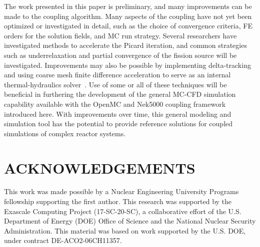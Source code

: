 \documentclass[letterpaper]{physor2018}
\begin{document}
The work presented in this paper is preliminary, and many improvements
can be made to the coupling algorithm. Many aspects of the coupling have not yet
been optimized or investigated in detail, such as the choice of convergence criteria,
FE orders for the solution fields, and MC run strategy. Several researchers
have investigated methods to accelerate the Picard iteration,
and common strategies such as underrelaxation and partial convergence
of the fission source will be investigated. Improvements
may also be possible by implementing delta-tracking and using coarse
mesh finite difference acceleration to serve as an internal
thermal-hydraulics solver~\cite{Herman}. Use of some or all of
these techniques will be beneficial in furthering the development of
the general MC-CFD simulation capability available with the
OpenMC and Nek5000 coupling framework introduced here. With improvements over time, this
general modeling and simulation tool has the potential to provide reference solutions
for coupled simulations of complex reactor systems.


\section*{ACKNOWLEDGEMENTS}

This work was made possible by a Nuclear Engineering University Programs
fellowship supporting the first author. This research was supported by the
Exascale Computing Project (17-SC-20-SC), a collaborative effort of the
U.S. Department of Energy (DOE) Office of Science and the National Nuclear Security
Administration. This material was based on work supported by the U.S. DOE, under
contract DE-ACO2-06CH11357.

% 
% 
\end{document}
